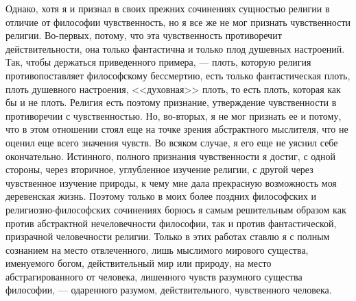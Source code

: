 \documentclass[12pt]{article}
\begin{document}
Однако, хотя я и признал в своих прежних сочинениях сущностью религии в отличие от философии чувственность, но я все же не мог признать чувственности религии. Во-первых, потому, что эта чувственность противоречит действительности, она только фантастична и только плод душевных настроений. Так, чтобы держаться приведенного примера, --- плоть, которую религия противопоставляет философскому бессмертию, есть только фантастическая плоть, плоть душевного настроения, <<духовная>> плоть, то есть плоть, которая как бы и не плоть. Религия есть поэтому признание, утверждение чувственности в противоречии с чувственностью. Но, во-вторых, я не мог признать ее и потому, что в этом отношении стоял еще на точке зрения абстрактного мыслителя, что не оценил еще всего значения чувств. Во всяком случае, я его еще не уяснил себе окончательно. Истинного, полного признания чувственности я достиг, с одной стороны, через вторичное, углубленное изучение религии, с другой через чувственное изучение природы, к чему мне дала прекрасную возможность моя деревенская жизнь. Поэтому только в моих более поздних философских и религиозно-философских сочинениях борюсь я самым решительным образом как против абстрактной нечеловечности философии, так и против фантастической, призрачной человечности религии. Только в этих работах ставлю я с полным сознанием на место отвлеченного, лишь мыслимого мирового существа, именуемого богом, действительный мир или природу, на место абстрагированного от человека, лишенного чувств разумного существа философии, --- одаренного разумом, действительного, чувственного человека. 
\end{document}
